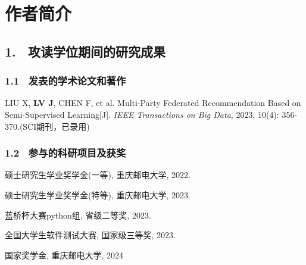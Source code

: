 \specialsectioning


\chapter{作者简介}
\thispagestyle{others}
\pagestyle{others}
\xiaosi

%
%
%
\section{1. \ 攻读学位期间的研究成果}

\vspace{0.2cm}


\subsection{1.1 \ 发表的学术论文和著作}
\begin{enumerate}[label={[{\arabic*}]}, leftmargin=2em]
	\item  LIU X, \textbf{LV J}, CHEN F, et al. Multi-Party Federated Recommendation Based on Semi-Supervised Learning[J]. \textit{IEEE Transactions on Big Data}, 2023, 10(4): 356-370.(SCI期刊，已录用)
\end{enumerate}


\subsection{1.2 \ 参与的科研项目及获奖}
\begin{enumerate}[label={[{\arabic*}]}, leftmargin=2em, itemsep=0pt, parsep=0pt, topsep=0pt]
	\item  硕士研究生学业奖学金(一等), 重庆邮电大学, 2022.
	\item  硕士研究生学业奖学金(特等), 重庆邮电大学, 2023.
	\item  蓝桥杯大赛python组, 省级二等奖, 2023.
	\item  全国大学生软件测试大赛, 国家级三等奖, 2023.
	\item  国家奖学金, 重庆邮电大学, 2024
\end{enumerate}






